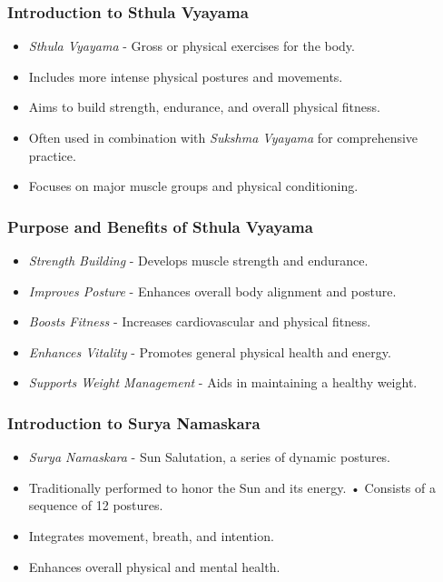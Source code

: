 \begin{frame}[fragile]\frametitle{Introduction to Sthula Vyayama}

      \begin{itemize}
		\item \textit{Sthula Vyayama} - Gross or physical exercises for the body.
		\item Includes more intense physical postures and movements.
		\item Aims to build strength, endurance, and overall physical fitness.
		\item Often used in combination with \textit{Sukshma Vyayama} for comprehensive practice.
		\item Focuses on major muscle groups and physical conditioning.
	  \end{itemize}

\end{frame}

\begin{frame}[fragile]\frametitle{Purpose and Benefits of Sthula Vyayama}

      \begin{itemize}
		\item \textit{Strength Building} - Develops muscle strength and endurance.
		\item \textit{Improves Posture} - Enhances overall body alignment and posture.
		\item \textit{Boosts Fitness} - Increases cardiovascular and physical fitness.
		\item \textit{Enhances Vitality} - Promotes general physical health and energy.
		\item \textit{Supports Weight Management} - Aids in maintaining a healthy weight.
	  \end{itemize}

\end{frame}

\begin{frame}[fragile]\frametitle{Introduction to Surya Namaskara}

      \begin{itemize}
		\item \textit{Surya Namaskara} - Sun Salutation, a series of dynamic postures.
		\item Traditionally performed to honor the Sun and its energy.
		• Consists of a sequence of 12 postures.
		\item Integrates movement, breath, and intention.
		\item Enhances overall physical and mental health.
	  \end{itemize}

\end{frame}

